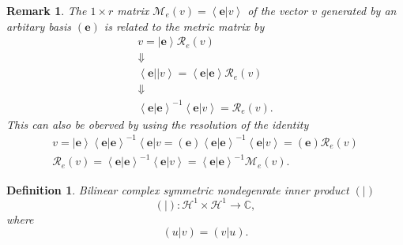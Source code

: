 \documentclass[aps,preprint]{revtex4}%
\newtheorem{definition}[theorem]{Definition}
\newtheorem{remark}[theorem]{Remark}
\begin{document}
\begin{remark}
The $1\times r$ matrix $\mathcal{M}_{e}\left(  v\right)  =\left\langle \left.
\mathbf{e}\right\vert v\right\rangle $ of the vector $v$ generated by an
arbitary basis $\left(  \mathbf{e}\right)  $ is related to the metric matrix
by%
\begin{gather}
v=\left\vert \mathbf{e}\right\rangle \mathcal{R}_{e}\left(  v\right) \\
\Downarrow\\
\left\langle \mathbf{e}\right\vert \left\vert v\right\rangle =\left\langle
\left.  \mathbf{e}\right\vert \mathbf{e}\right\rangle \mathcal{R}_{e}\left(
v\right) \\
\Downarrow\\
\left\langle \left.  \mathbf{e}\right\vert \mathbf{e}\right\rangle
^{-1}\left\langle \left.  \mathbf{e}\right\vert v\right\rangle =\mathcal{R}%
_{e}\left(  v\right)  .
\end{gather}
This can also be oberved by using the resolution of the identity
\begin{gather}
v=\left\vert \mathbf{e}\right\rangle \left\langle \left.  \mathbf{e}%
\right\vert \mathbf{e}\right\rangle ^{-1}\left\langle \mathbf{e}\right\vert
v=\left(  \mathbf{e}\right)  \left\langle \left.  \mathbf{e}\right\vert
\mathbf{e}\right\rangle ^{-1}\left\langle \left.  \mathbf{e}\right\vert
v\right\rangle =\left(  \mathbf{e}\right)  \mathcal{R}_{e}\left(  v\right) \\
\mathcal{R}_{e}\left(  v\right)  =\left\langle \left.  \mathbf{e}\right\vert
\mathbf{e}\right\rangle ^{-1}\left\langle \left.  \mathbf{e}\right\vert
v\right\rangle =\left\langle \left.  \mathbf{e}\right\vert \mathbf{e}%
\right\rangle ^{-1}\mathcal{M}_{e}\left(  v\right)  .
\end{gather}

\end{remark}

\begin{definition}
\emph{Bilinear complex symmetric nondegenrate inner product} $\left(  \left.
{}\right\vert \right)  $
\begin{equation}
\left(  \left.  {}\right\vert \right)  :\mathcal{H}^{1}\times\mathcal{H}%
^{1}\rightarrow\mathbb{C},
\end{equation}
where
\begin{equation}
\left(  \left.  u\right\vert v\right)  =\left(  \left.  v\right\vert u\right)
.
\end{equation}

\end{definition}
\end{document}
